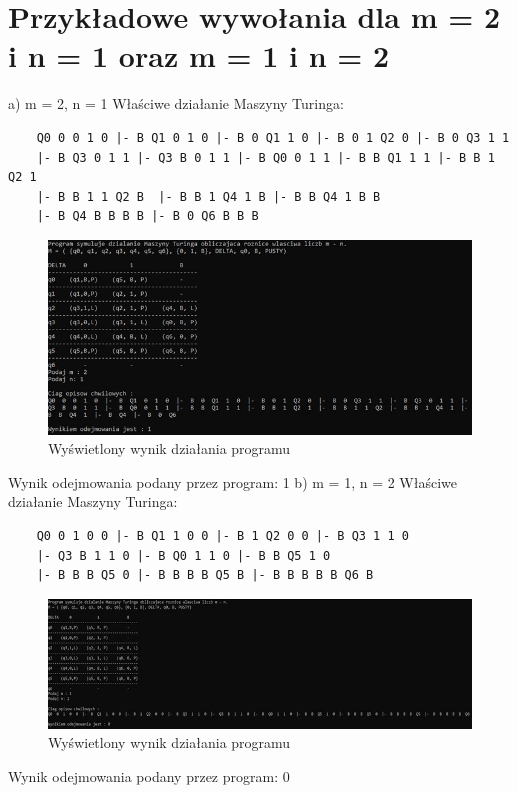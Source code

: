 \documentclass[10pt, a4paper]{report}
\begin{document}
    \newpage

    \section{Przykładowe wywołania dla m = 2 i n = 1 oraz m = 1 i n = 2}
    a) m = 2, n = 1
    Właściwe działanie Maszyny Turinga: 
    \begin{lstlisting}
    Q0 0 0 1 0 |- B Q1 0 1 0 |- B 0 Q1 1 0 |- B 0 1 Q2 0 |- B 0 Q3 1 1 
    |- B Q3 0 1 1 |- Q3 B 0 1 1 |- B Q0 0 1 1 |- B B Q1 1 1 |- B B 1 Q2 1 
    |- B B 1 1 Q2 B  |- B B 1 Q4 1 B |- B B Q4 1 B B 
    |- B Q4 B B B B |- B 0 Q6 B B B         
    \end{lstlisting}

    \begin{figure}[h]
        \begin{center}
            \includegraphics[scale=0.8]{photo4.jpg}
            \caption{ Wyświetlony wynik działania programu}
        \end{center}
    \end{figure}
    \newpage
    Wynik odejmowania podany przez program: 1
    \newline\newline b) m = 1, n = 2
    Właściwe działanie Maszyny Turinga: 
    \begin{lstlisting}
    Q0 0 1 0 0 |- B Q1 1 0 0 |- B 1 Q2 0 0 |- B Q3 1 1 0 
    |- Q3 B 1 1 0 |- B Q0 1 1 0 |- B B Q5 1 0
    |- B B B Q5 0 |- B B B B Q5 B |- B B B B B Q6 B        
    \end{lstlisting}

    \begin{figure}[h]
        \begin{center}
            \includegraphics[scale=0.8]{photo5.jpg}
            \caption{ Wyświetlony wynik działania programu}
        \end{center}
    \end{figure}
    Wynik odejmowania podany przez program: 0 
\end{document}
